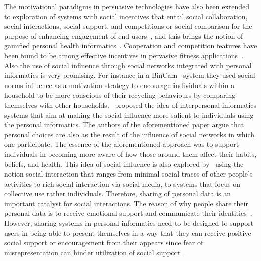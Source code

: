 The motivational paradigms in persuasive technologies have also been extended to exploration of systems with social incentives that entail social collaboration, social interactions, social support, and competitions or social comparison for the purpose of enhancing engagement of end users~\citep{ploderer2014social,chen2016social,epstein2015nobody,reno2016matters}, and this brings the notion of gamified personal health informatics~\citep{lin2006:fish,chen2014healthytogether,han2014designing}. Cooperation and competition features have been found to be among effective incentives in pervasive fitness applications~\citep{chen2016social}. Also the use of social influence through social networks integrated with personal informatics is very promising. For instance in a BinCam~\citep{comber2013bincam,comber2013designing} system they used social norms influence as a motivation strategy to encourage individuals within a household to be more conscious of their recycling behaviours by comparing themselves with other households.~\cite{bales2011interpersonal} proposed the idea of interpersonal informatics systems that aim at making the social influence more salient to individuals using the personal informatics. The authors of the aforementioned paper argue that personal choices are also as the result of the influence of social networks in which one participate. The essence of the aforementioned approach was to support individuals in becoming more aware of how those around them affect their habits, beliefs, and health. This idea of social influence is also explored by~\cite{ploderer2014social} using the notion social interaction that ranges from minimal social traces of other people's activities to rich social interaction via social media, to systems that focus on collective use rather individuals. Therefore, sharing of personal data is an important catalyst for social interactions. The reason of why people share their personal data is to receive emotional support and communicate their identities~\citep{epstein2015nobody}. However, sharing systems in personal informatics need to be designed to support users in being able to present themselves in a way that they can receive positive social support or encouragement from their appears since fear of misrepresentation can hinder utilization of social support~\citep{ploderer2014social,epstein2015nobody,reno2016matters}.

